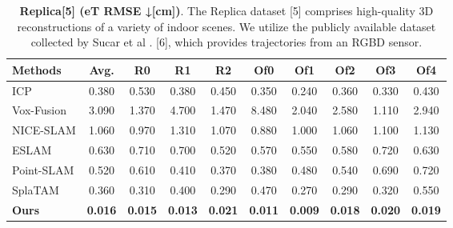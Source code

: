 \documentclass[twocolumn]{article} %
\begin{document}
\begin{table}[htbp]
\centering
\caption{\textbf{Replica[5] (eT RMSE ↓[cm])}. The Replica dataset [5] comprises high-quality 3D reconstructions of a variety of indoor scenes. We utilize the publicly available dataset collected by Sucar et al . [6], which provides trajectories from an RGBD sensor.}
\label{table:_textbf_replica_5_et}
\begin{adjustbox}{max width=\columnwidth,max height=!,center}
\begin{tabular}{lccccccccc}
\toprule
\textbf{Methods} & \textbf{Avg.} & \textbf{R0} & \textbf{R1} & \textbf{R2} & \textbf{Of0} & \textbf{Of1} & \textbf{Of2} & \textbf{Of3} & \textbf{Of4}\\
\midrule
ICP & \cellcolor{lime!50}0.380 & \cellcolor{lime!50}0.530 & \cellcolor{yellow!30}0.380 & 0.450 & \cellcolor{yellow!30}0.350 & \cellcolor{yellow!30}0.240 & \cellcolor{lime!50}0.360 & \cellcolor{lime!50}0.330 & \cellcolor{yellow!30}0.430\\
Vox-Fusion & 3.090 & 1.370 & 4.700 & 1.470 & 8.480 & 2.040 & 2.580 & 1.110 & 2.940\\
NICE-SLAM & 1.060 & 0.970 & 1.310 & 1.070 & 0.880 & 1.000 & 1.060 & 1.100 & 1.130\\
ESLAM & 0.630 & 0.710 & 0.700 & 0.520 & 0.570 & 0.550 & 0.580 & 0.720 & 0.630\\
Point-SLAM & 0.520 & 0.610 & 0.410 & \cellcolor{lime!50}0.370 & \cellcolor{lime!50}0.380 & 0.480 & 0.540 & 0.690 & 0.720\\
SplaTAM & \cellcolor{yellow!30}0.360 & \cellcolor{yellow!30}0.310 & \cellcolor{lime!50}0.400 & \cellcolor{yellow!30}0.290 & 0.470 & \cellcolor{lime!50}0.270 & \cellcolor{yellow!30}0.290 & \cellcolor{yellow!30}0.320 & \cellcolor{lime!50}0.550\\
\midrule
\textbf{Ours} & \cellcolor{green!30}\textbf{0.016} & \cellcolor{green!30}\textbf{0.015} & \cellcolor{green!30}\textbf{0.013} & \cellcolor{green!30}\textbf{0.021} & \cellcolor{green!30}\textbf{0.011} & \cellcolor{green!30}\textbf{0.009} & \cellcolor{green!30}\textbf{0.018} & \cellcolor{green!30}\textbf{0.020} & \cellcolor{green!30}\textbf{0.019}\\
\bottomrule
\end{tabular}
\end{adjustbox}
\end{table}
\end{document}
